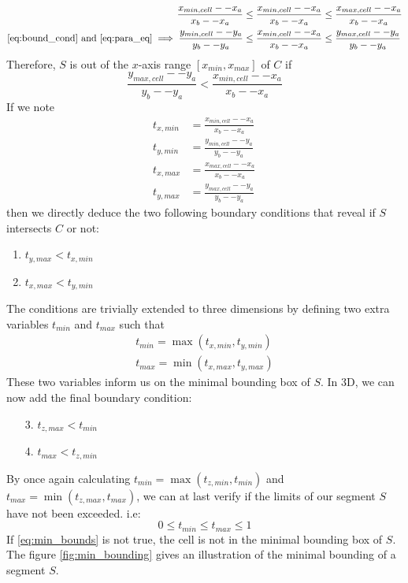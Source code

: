 \documentclass[
	a4paper,
	12pt,
	raggedright,
	twoside
]{tufte-style-article}
\theoremstyle{definition}
\theoremstyle{remark}
\begin{document}
\begin{align}
\frac{x_{min, cell} -- x_a}{x_b -- x_a} &\leq \frac{x_{min, cell} -- x_a}{x_b -- x_a} \leq \frac{x_{max, cell} -- x_a}{x_b -- x_a}
\\
\ref{eq:bound_cond} \text{ and } \ref{eq:para_eq} \implies
\frac{y_{min, cell} -- y_a}{y_b -- y_a} &\leq \frac{x_{min, cell} -- x_a}{x_b -- x_a} \leq \frac{y_{max, cell} -- y_a}{y_b -- y_a}
\end{align}
Therefore, $S$ is out of the $x$-axis range $[x_{min}, x_{max}]$ of $C$ if
\[
\frac{y_{max, cell} -- y_a}{y_b -- y_a} < \frac{x_{min, cell} -- x_a}{x_b -- x_a}
\]
If we note
\begin{align}
    t_{x,min} &= \frac{x_{min, cell} -- x_a}{x_b -- x_a} \\
    t_{y,min} &= \frac{y_{min, cell} -- y_a}{y_b -- y_a} \\
    t_{x,max} &= \frac{x_{max, cell} -- x_a}{x_b -- x_a} \\
    t_{y,max} &= \frac{y_{max, cell} -- y_a}{y_b -- y_a}\
\end{align}
then we directly deduce the two following boundary conditions that reveal if $S$ intersects $C$ or not:
\begin{enumerate}
    \item $t_{y,max} < t_{x,min}$
    \item $t_{x,max} < t_{y,min}$
\end{enumerate}
The conditions are trivially extended to three dimensions by defining two extra variables $t_{min}$ and $t_{max}$ such that
\begin{gather}
    t_{min} = \max ( t_{x,min} , t_{y,min} ) \\
    t_{max} = \min ( t_{x,max} , t_{y,max} )
\end{gather}
These two variables inform us on the minimal bounding box of $S$. In 3D, we can now add the final boundary condition:
\begin{enumerate}
    \item[3.] $t_{z,max} < t_{min}$
    \item[4.] $t_{max} < t_{z,min}$
\end{enumerate}
By once again calculating $ t_{min} = \max ( t_{z,min} , t_{min} )$  and $t_{max} = \min ( t_{z,max} , t_{max} )$, we can at last verify if the limits of our segment $S$ have not been exceeded. i.e:
\begin{equation}\label{eq:min_bounds}
    0 \leq t_{min} \leq t_{max} \leq 1
\end{equation}
If \ref{eq:min_bounds} is not true, the cell is not in the minimal bounding box of $S$. The figure \ref{fig:min_bounding} gives an illustration of the minimal bounding of a segment $S$.
\begin{figure}
    \centering
    
\end{figure}
\end{document}
